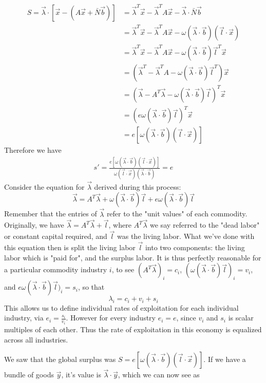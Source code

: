 \begin{align*}
	S = \vec{\lambda}\cdot [\vec{x} - (A\vec{x} + \bar{N}\vec{b})] &= \vec{\lambda}^T\vec{x} - \vec{\lambda}^T A\vec{x} - \vec{\lambda}\cdot \bar{N} \vec{b} \\
	&= \vec{\lambda}^T\vec{x} - \vec{\lambda}^T A\vec{x} - \omega (\vec{\lambda} \cdot \vec{b})(\vec{l} \cdot \vec{x}) \\
	&= \vec{\lambda}^T\vec{x} - \vec{\lambda}^T A\vec{x} - \omega (\vec{\lambda} \cdot \vec{b})\vec{l}^T\vec{x} \\
	&= (\vec{\lambda}^T - \vec{\lambda}^T A - \omega (\vec{\lambda} \cdot \vec{b})\vec{l}^T)\vec{x} \\
	&= (\vec{\lambda} - A^T\vec{\lambda} - \omega(\vec{\lambda}\cdot \vec{b})\vec{l})^T\vec{x} \\
	&= (e\omega(\vec{\lambda}\cdot\vec{b})\vec{l})^T\vec{x} \\
	&= e[\omega(\vec{\lambda} \cdot \vec{b})(\vec{l}\cdot \vec{x})]
\end{align*}
Therefore we have
\begin{align*} 
s' = \frac{e[\omega(\vec{\lambda} \cdot \vec{b})(\vec{l}\cdot \vec{x})]}{\omega (\vec{l} \cdot \vec{x})(\vec{\lambda} \cdot \vec{b})} = e
\end{align*}
Consider the equation for $\vec{\lambda}$ derived during this process:
\[ \vec{\lambda} = A^T\vec{\lambda} + \omega(\vec{\lambda}\cdot\vec{b})\vec{l} + e\omega(\vec{\lambda}\cdot\vec{b})\vec{l} \]
Remember that the entries of $\vec{\lambda}$ refer to the "unit values" of each commodity. Originally, we have $\vec{\lambda} = A^T\vec{\lambda} + \vec{l}$, where $A^T\vec{\lambda}$ we say referred to the "dead labor" or constant capital required, and $\vec{l}$ was the living labor. What we've done with this equation then is split the living labor $\vec{l}$ into two components: the living labor which is "paid for", and the surplus labor. It is thus perfectly reasonable for a particular commodity industry $i$, to see $(A^T\vec{\lambda})_i = c_i$, $(\omega(\vec{\lambda}\cdot\vec{b})\vec{l})_i = v_i$, and $e\omega(\vec{\lambda}\cdot\vec{b})\vec{l})_i = s_i$, so that
\[ \lambda_i = c_i + v_i + s_i \]
This allows us to define individual rates of exploitation for each individual industry, via $e_i = \frac{s_i}{v_i}$. However for every industry $e_i = e$, since $v_i$ and $s_i$ is scalar multiples of each other. Thus the rate of exploitation in this economy is equalized across all industries. \par 
We saw that the global surplus was $S = e[\omega(\vec{\lambda} \cdot \vec{b})(\vec{l}\cdot \vec{x})]$. If we have a bundle of goods $\vec{y}$, it's value is $\vec{\lambda} \cdot \vec{y}$, which we can now see as 
